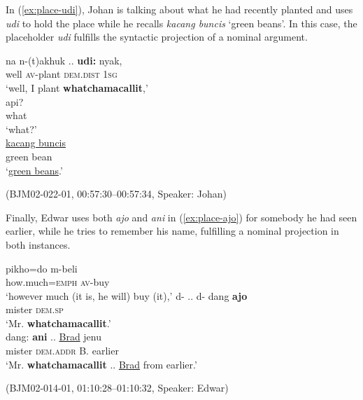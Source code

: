 \documentclass[output=paper,colorlinks,citecolor=brown
\ChapterDOI{10.5281/zenodo.15697585}
]{langscibook}
\begin{document}
In (\ref{ex:place-udi}), Johan is talking about what he had recently planted and uses \textit{udi} to hold the place while he recalls \textit{kacang buncis} `green beans'. In this case, the placeholder \textit{udi} fulfills the syntactic projection of a nominal argument.

\begin{exe}
    \ex\label{ex:place-udi} \begin{xlist}[0\quad →A:]
         \gll
        na n-(t)akhuk .. \textbf{udi:} nyak, \\
        well \textsc{av}-plant {} \textsc{dem.dist} 1\textsc{sg} \\
        \glt `well, I plant \textbf{whatchamacallit},' \\
        \exi{2\quad \hphantom{→J:}} \gll
        api?\\
        what \\
        \glt `what?' \\
        \exi{3\quad \hphantom{→J:}} \gll
        \uline{kacang buncis} \\
        {green bean} \\
        \glt `\uline{green beans}.' \\
    \end{xlist}
    \hfill (BJM02-022-01, 00:57:30–00:57:34, Speaker: Johan) 
\end{exe}

Finally, Edwar uses both \textit{ajo} and \textit{ani} in (\ref{ex:place-ajo}) for somebody he had seen earlier, while he tries to remember his name, fulfilling a nominal projection in both instances. 

\begin{exe}
    \ex\label{ex:place-ajo} \begin{xlist}[0\quad →A:]
         \gll
        pikho=do m-beli \\
        how.much=\textsc{emph} \textsc{av}-buy \\
        \glt `however much (it is, he will) buy (it),'
         \gll
        d- .. d- dang \textbf{ajo} \\
        {} {} {} mister \textsc{dem.sp} \\
        \glt `Mr. \textbf{whatchamacallit}.' \\
         \gll
        dang: \textbf{ani} .. \uline{Brad} jenu \\
        mister \textsc{dem.addr} {} B. earlier \\
        \glt `Mr. \textbf{whatchamacallit} .. \uline{Brad} from earlier.' \\
    \end{xlist}
    \hfill (BJM02-014-01, 01:10:28–01:10:32, Speaker: Edwar) 
\end{exe}
\end{document}
